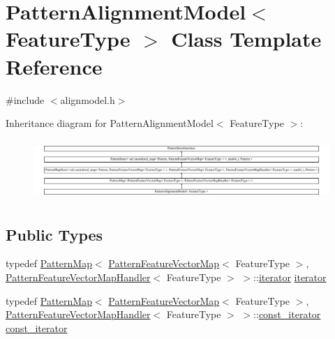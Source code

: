 \hypertarget{classPatternAlignmentModel}{}\section{Pattern\+Alignment\+Model$<$ Feature\+Type $>$ Class Template Reference}
\label{classPatternAlignmentModel}


{\ttfamily \#include $<$alignmodel.\+h$>$}

Inheritance diagram for Pattern\+Alignment\+Model$<$ Feature\+Type $>$\+:\begin{figure}[H]
\begin{center}
\leavevmode
\includegraphics[height=2.300740cm]{classPatternAlignmentModel}
\end{center}
\end{figure}
\subsection*{Public Types}
\begin{DoxyCompactItemize}
\item 
typedef \hyperlink{classPatternMap}{Pattern\+Map}$<$ \hyperlink{classPatternFeatureVectorMap}{Pattern\+Feature\+Vector\+Map}$<$ Feature\+Type $>$, \hyperlink{classPatternFeatureVectorMapHandler}{Pattern\+Feature\+Vector\+Map\+Handler}$<$ Feature\+Type $>$ $>$\+::\hyperlink{classPatternAlignmentModel_a108db1926176ea0b761a8329fc73e3e7}{iterator} \hyperlink{classPatternAlignmentModel_a108db1926176ea0b761a8329fc73e3e7}{iterator}
\item 
typedef \hyperlink{classPatternMap}{Pattern\+Map}$<$ \hyperlink{classPatternFeatureVectorMap}{Pattern\+Feature\+Vector\+Map}$<$ Feature\+Type $>$, \hyperlink{classPatternFeatureVectorMapHandler}{Pattern\+Feature\+Vector\+Map\+Handler}$<$ Feature\+Type $>$ $>$\+::\hyperlink{classPatternAlignmentModel_ac8d8a6556af4672ceb0f29d7cfaa9db4}{const\+\_\+iterator} \hyperlink{classPatternAlignmentModel_ac8d8a6556af4672ceb0f29d7cfaa9db4}{const\+\_\+iterator}
\end{DoxyCompactItemize}
